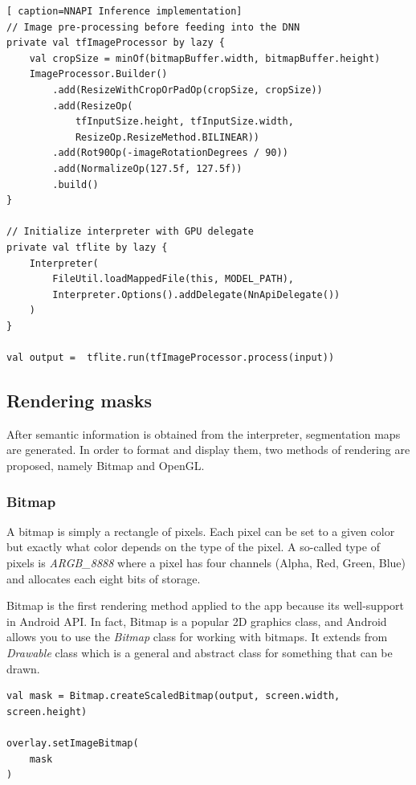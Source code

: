 \begin{lstlisting}[ caption=NNAPI Inference implementation]
// Image pre-processing before feeding into the DNN
private val tfImageProcessor by lazy {
    val cropSize = minOf(bitmapBuffer.width, bitmapBuffer.height)
    ImageProcessor.Builder()
        .add(ResizeWithCropOrPadOp(cropSize, cropSize))
        .add(ResizeOp(
            tfInputSize.height, tfInputSize.width,
            ResizeOp.ResizeMethod.BILINEAR))
        .add(Rot90Op(-imageRotationDegrees / 90))
        .add(NormalizeOp(127.5f, 127.5f))
        .build()
}

// Initialize interpreter with GPU delegate
private val tflite by lazy {
    Interpreter(
        FileUtil.loadMappedFile(this, MODEL_PATH),
        Interpreter.Options().addDelegate(NnApiDelegate())
    )
}

val output =  tflite.run(tfImageProcessor.process(input))
\end{lstlisting}
 
 
 
 
 
 
 
\subsection{Rendering masks}
After semantic information is obtained from the interpreter, segmentation maps are generated. In order to format and display them, two methods of rendering are proposed, namely Bitmap and OpenGL.

\subsubsection{Bitmap}
A bitmap is simply a rectangle of pixels. Each pixel can be set to a given color but exactly what color depends on the type of the pixel. A so-called type of pixels is \emph{ARGB\_8888} where a pixel has four channels (Alpha, Red, Green, Blue) and allocates each eight bits of storage.\par

Bitmap is the first rendering method applied to the app because its well-support in Android API. In fact, Bitmap is a popular 2D graphics class, and Android allows you to use the \emph{Bitmap} class for working with bitmaps. It extends from \emph{Drawable} class which is a general and abstract class for something that can be drawn.  \par


\begin{lstlisting}[caption=Bitmap rendering implementation]
val mask = Bitmap.createScaledBitmap(output, screen.width, screen.height)

overlay.setImageBitmap(
    mask
)
\end{lstlisting}

